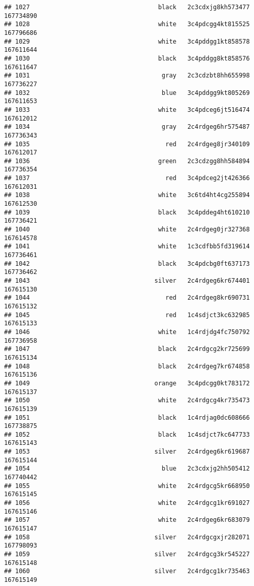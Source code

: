 \documentclass[
]{article}
\begin{document}
\begin{verbatim}
## 1027                                   black   2c3cdxjg8kh573477 167734890
## 1028                                   white   3c4pdcgg4kt815525 167796686
## 1029                                   white   3c4pddgg1kt858578 167611644
## 1030                                   black   3c4pddgg8kt858576 167611647
## 1031                                    gray   2c3cdzbt8hh655998 167736227
## 1032                                    blue   3c4pddgg9kt805269 167611653
## 1033                                   white   3c4pdceg6jt516474 167612012
## 1034                                    gray   2c4rdgeg6hr575487 167736343
## 1035                                     red   2c4rdgeg8jr340109 167612017
## 1036                                   green   2c3cdzgg8hh584894 167736354
## 1037                                     red   3c4pdceg2jt426366 167612031
## 1038                                   white   3c6td4ht4cg255894 167612530
## 1039                                   black   3c4pddeg4ht610210 167736421
## 1040                                   white   2c4rdgeg0jr327368 167614578
## 1041                                   white   1c3cdfbb5fd319614 167736461
## 1042                                   black   3c4pdcbg0ft637173 167736462
## 1043                                  silver   2c4rdgeg6kr674401 167615130
## 1044                                     red   2c4rdgeg8kr690731 167615132
## 1045                                     red   1c4sdjct3kc632985 167615133
## 1046                                   white   1c4rdjdg4fc750792 167736958
## 1047                                   black   2c4rdgcg2kr725699 167615134
## 1048                                   black   2c4rdgeg7kr674858 167615136
## 1049                                  orange   3c4pdcgg0kt783172 167615137
## 1050                                   white   2c4rdgcg4kr735473 167615139
## 1051                                   black   1c4rdjag0dc608666 167738875
## 1052                                   black   1c4sdjct7kc647733 167615143
## 1053                                  silver   2c4rdgeg6kr619687 167615144
## 1054                                    blue   2c3cdxjg2hh505412 167740442
## 1055                                   white   2c4rdgcg5kr668950 167615145
## 1056                                   white   2c4rdgcg1kr691027 167615146
## 1057                                   white   2c4rdgeg6kr683079 167615147
## 1058                                  silver   2c4rdgcgxjr282071 167798093
## 1059                                  silver   2c4rdgcg3kr545227 167615148
## 1060                                  silver   2c4rdgcg1kr735463 167615149

\end{verbatim}
\end{document}
